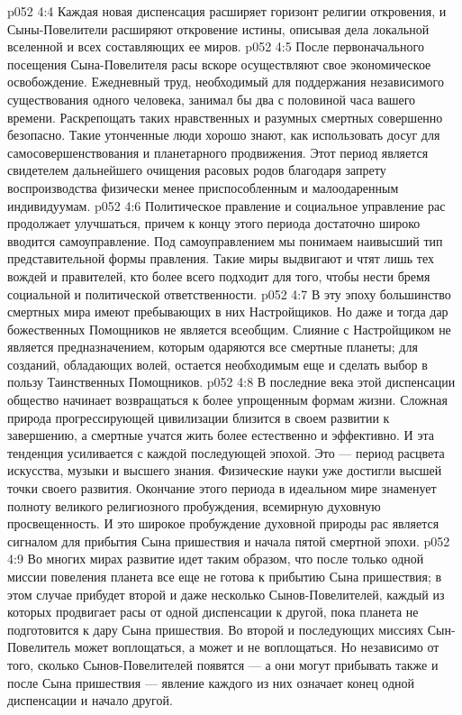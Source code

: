 \vs p052 4:4 Каждая новая диспенсация расширяет горизонт религии откровения, и Сыны\hyp{}Повелители расширяют откровение истины, описывая дела локальной вселенной и всех составляющих ее миров.
\vs p052 4:5 \pc После первоначального посещения Сына\hyp{}Повелителя расы вскоре осуществляют свое экономическое освобождение. Ежедневный труд, необходимый для поддержания независимого существования одного человека, занимал бы два с половиной часа вашего времени. Раскрепощать таких нравственных и разумных смертных совершенно безопасно. Такие утонченные люди хорошо знают, как использовать досуг для самосовершенствования и планетарного продвижения. Этот период является свидетелем дальнейшего очищения расовых родов благодаря запрету воспроизводства физически менее приспособленным и малоодаренным индивидуумам.
\vs p052 4:6 Политическое правление и социальное управление рас продолжает улучшаться, причем к концу этого периода достаточно широко вводится самоуправление. Под самоуправлением мы понимаем наивысший тип представительной формы правления. Такие миры выдвигают и чтят лишь тех вождей и правителей, кто более всего подходит для того, чтобы нести бремя социальной и политической ответственности.
\vs p052 4:7 В эту эпоху большинство смертных мира имеют пребывающих в них Настройщиков. Но даже и тогда дар божественных Помощников не является всеобщим. Слияние с Настройщиком не является предназначением, которым одаряются все смертные планеты; для созданий, обладающих волей, остается необходимым еще и сделать выбор в пользу Таинственных Помощников.
\vs p052 4:8 В последние века этой диспенсации общество начинает возвращаться к более упрощенным формам жизни. Сложная природа прогрессирующей цивилизации близится в своем развитии к завершению, а смертные учатся жить более естественно и эффективно. И эта тенденция усиливается с каждой последующей эпохой. Это --- период расцвета искусства, музыки и высшего знания. Физические науки уже достигли высшей точки своего развития. Окончание этого периода в идеальном мире знаменует полноту великого религиозного пробуждения, всемирную духовную просвещенность. И это широкое пробуждение духовной природы рас является сигналом для прибытия Сына пришествия и начала пятой смертной эпохи.
\vs p052 4:9 \pc Во многих мирах развитие идет таким образом, что после только одной миссии повеления планета все еще не готова к прибытию Сына пришествия; в этом случае прибудет второй и даже несколько Сынов\hyp{}Повелителей, каждый из которых продвигает расы от одной диспенсации к другой, пока планета не подготовится к дару Сына пришествия. Во второй и последующих миссиях Сын\hyp{}Повелитель может воплощаться, а может и не воплощаться. Но независимо от того, сколько Сынов\hyp{}Повелителей появятся --- а они могут прибывать также и после Сына пришествия --- явление каждого из них означает конец одной диспенсации и начало другой.
